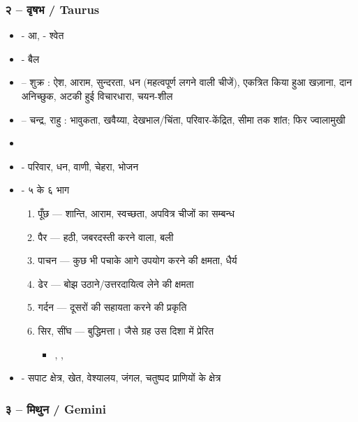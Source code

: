 \subsubsection{२ -- वृषभ / \textenglish{Taurus}}
\begin{itemize}
    \item {} - आ,  - श्वेत
    \item {} - बैल
    \item {} -- शुक्र : ऐश, आराम, सुन्दरता, धन (महत्वपूर्ण लगने वाली चीजें), एकत्रित किया हुआ खज़ाना, दान अनिच्छुक, अटकी हुई विचारधारा, चयन-शील
    \item {} -- चन्द्र, राहु : भावुकता, खवैय्या, देखभाल/चिंता, परिवार-केंद्रित, सीमा तक शांत; फिर ज्वालामुखी
    \item {}
    \item {} - परिवार, धन, वाणी, चेहरा, भोजन
    \item {} - ५ के ६ भाग \begin{enumerate}
        \item पूँछ --- शान्ति, आराम, स्वच्छता, अपवित्र चीजों का सम्बन्ध
        \item पैर --- हठी, जबरदस्ती करने वाला, बली
        \item पाचन --- कुछ भी पचाके आगे उपयोग करने की क्षमता, धैर्य
        \item ढेर --- बोझ उठाने/उत्तरदायित्व लेने की क्षमता
        \item गर्दन --- दूसरों की सहायता करने की प्रकृति
        \item सिर, सींघ --- बुद्धिमत्ता। जैसे ग्रह उस दिशा में प्रेरित \begin{itemize}
            \item {}, , 
        \end{itemize}
    \end{enumerate}
    \item {} - सपाट क्षेत्र, खेत, वेश्यालय, जंगल, चतुष्पद प्राणियों के क्षेत्र
\end{itemize}
\subsubsection{३ -- मिथुन / \textenglish{Gemini}}